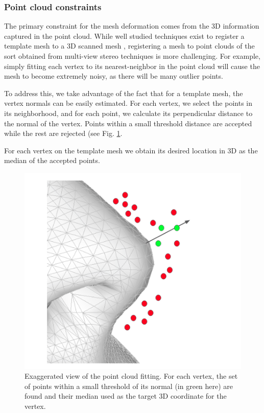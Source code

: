 \documentclass[10pt,twocolumn,letterpaper]{article}
\begin{document}
 
 \subsubsection{Point cloud constraints}
 The primary constraint for the mesh deformation comes from the 3D information captured in the point cloud.
 While well studied techniques exist to register a template mesh to a 3D scanned mesh \cite{amberg2007optimal}, registering a mesh to point clouds of the sort obtained from multi-view stereo techniques is more challenging. For example, simply fitting each vertex to its nearest-neighbor in the point cloud will cause the mesh to become extremely noisy, as there will be many outlier points.
 
To address this, we take advantage of the fact that for a template mesh, the vertex normals can be easily estimated. For each vertex, we select the points in its neighborhood, and for each point, we calculate its perpendicular distance to the normal of the vertex. Points within a small threshold distance are accepted while the rest are rejected (see Fig. \ref{fig:mesh_fit_pcl}. 
 
 For each vertex on the template mesh we obtain its desired location in 3D as the median of the accepted points. \\
 
\begin{figure}[t]
\begin{center}
   \includegraphics[width=0.8\linewidth]{images/mesh_fit_pcl.png}
\end{center}
   \caption{Exaggerated view of the point cloud fitting. For each vertex, the set of points within a small threshold of its normal (in green here) are found and their median used as the target 3D coordinate for the vertex. }
\label{fig:mesh_fit_pcl}
\end{figure}
\end{document}
